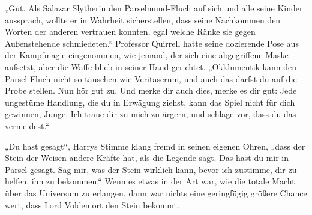 „Gut. Als Salazar Slytherin den Parselmund-Fluch auf sich und alle seine Kinder aussprach, wollte er in Wahrheit sicherstellen, dass seine Nachkommen den Worten der anderen vertrauen konnten, egal welche Ränke sie gegen Außenstehende schmiedeten.“
Professor Quirrell hatte seine dozierende Pose aus der Kampfmagie eingenommen, wie jemand, der sich eine abgegriffene Maske aufsetzt, aber die Waffe blieb in seiner Hand gerichtet.
„Okklumentik kann den Parsel-Fluch nicht so täuschen wie Veritaserum, und auch das darfst du auf die Probe stellen. Nun hör gut zu.  Und merke dir auch dies, merke es dir gut:  Jede ungestüme Handlung, die du in Erwägung ziehst, kann das Spiel nicht für dich gewinnen, Junge. Ich traue dir zu mich zu ärgern, und schlage vor, dass du das vermeidest.“

„Du hast gesagt“, Harrys Stimme klang fremd in seinen eigenen Ohren, „dass der Stein der Weisen andere Kräfte hat, als die Legende sagt. Das hast du mir in Parsel gesagt. Sag mir, was der Stein wirklich kann, bevor ich zustimme, dir zu helfen, ihn zu bekommen.“
Wenn es etwas in der Art war, wie die totale Macht über das Universum zu erlangen, dann war nichts eine geringfügig größere Chance wert, dass Lord Voldemort den Stein bekommt.

